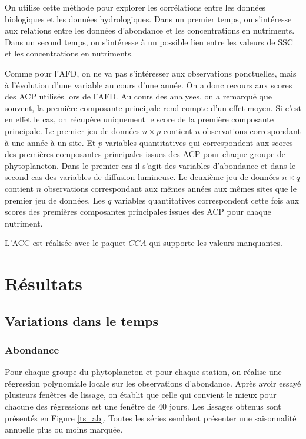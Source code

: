 \documentclass[12pt]{article}
\begin{document}
On utilise cette méthode pour explorer les corrélations entre les données biologiques et les données hydrologiques. Dans un premier temps, on s’intéresse aux relations entre les données d’abondance et les concentrations en nutriments. Dans un second temps, on s’intéresse à un possible lien entre les valeurs de SSC et les concentrations en nutriments.  

Comme pour l’AFD, on ne va pas s’intéresser aux observations ponctuelles, mais à l’évolution d’une variable au cours d’une année. On a donc recours aux scores des ACP utilisés lors de l’AFD. Au cours des analyses, on a remarqué que souvent, la première composante principale rend compte d’un effet moyen. Si c’est en effet le cas, on récupère uniquement le score de la première composante principale. Le premier jeu de données $n \times p$ contient $n$ observations correspondant à une année à un site. Et $p$ variables quantitatives qui correspondent aux scores des premières composantes principales issues des ACP pour chaque groupe de phytoplancton. Dans le premier cas il s’agit des variables d’abondance et dans le second cas des variables de diffusion lumineuse.  Le deuxième jeu de données $n \times q$ contient $n$ observations correspondant aux mêmes années aux mêmes sites que le premier jeu de données. Les $q$ variables quantitatives correspondent cette fois aux scores des premières composantes principales issues des ACP pour chaque nutriment.

L'ACC est réalisée avec le paquet $CCA$ qui supporte les valeurs manquantes. 


\section{Résultats}

\subsection{Variations dans le temps}

\subsubsection{Abondance}

Pour chaque groupe du phytoplancton et pour chaque station, on réalise une régression polynomiale locale sur les observations d’abondance. Après avoir essayé plusieurs fenêtres de lissage, on établit que celle qui convient le mieux pour chacune des régressions est une fenêtre de 40 jours. Les lissages obtenus sont présentés en Figure \ref{ts_ab}. Toutes les séries semblent présenter une saisonnalité annuelle plus ou moins marquée. 
\end{document}
